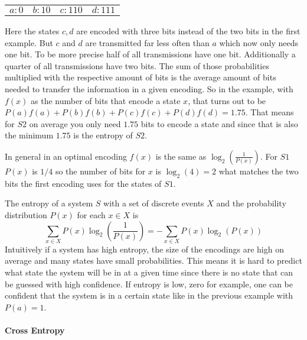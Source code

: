 \begin{center}
    \begin{tabular} {c c c c}
        $a: 0$ & $b: 10$ & $c: 110$ & $d: 111$
    \end{tabular}
\end{center}

Here the states $c, d$ are encoded with three bits instead of the two bits in the first example.
But $c$ and $d$ are transmitted far less often than $a$ which now only needs one bit. To be more precise
half of all transmissions have one bit. Additionally a quarter of all transmissions have two bits. 
The sum of those probabilities multiplied with the respective amount of bits is the average amount of bits
needed to transfer the information in a given encoding. So in the example, with $f(x)$ as the number of
bits that encode a state $x$, that turns out to be $P(a)f(a)+P(b)f(b)+P(c)f(c)+P(d)f(d)=1.75$.
That means for $S2$ on average you only need $1.75$ bits to encode a state and since that is also the
minimum $1.75$ is the entropy of $S2$.

In general in an optimal encoding $f(x)$ is the same as $\log _{2} (\frac{1}{P(x)})$. For $S1$ $P(x)$ is $1/4$
so the number of bits for $x$ is $\log_{2} (4)=2$ what matches the two bits the first encoding uses 
for the states of $S1$.

The entropy of a system $S$ with a set of discrete events $X$ and the probability distribution $P(x)$
for each $x\in X$ is
\[ \sum_{x\in X} P(x)\log _{2} (\frac{1}{P(x)}) = -\sum_{x\in X} P(x)\log _{2} (P(x))\]
Intuitively if a system has high entropy, the size of the encodings are high on average and many states
have small probabilities. This means it is hard to predict what state the system will be in at a given time
since there is no state that can be guessed with high confidence. If entropy is low, zero for example,
one can be confident that the system is in a certain state like in the previous example with $P(a)=1$.


\paragraph{Cross Entropy} \mbox{}

